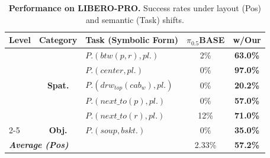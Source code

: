 \begin{table}[t]
  \centering
\caption{\textbf{Performance on LIBERO-PRO.} Success rates under layout (Pos) and semantic (Task) shifts.}%
  \label{tab:libero_pro}
  \small %
  \addtolength{\tabcolsep}{-4pt} %
  
  {
  \setlength{\aboverulesep}{0pt}
  \setlength{\belowrulesep}{0pt}
  
  \begin{tabular}{l|clcc}
    \toprule
    \rule{0pt}{3ex} \textbf{Level} & \textbf{Category} & \textbf{Task (Symbolic Form)} & \textbf{$\pi_{0.5}$BASE} & \textbf{w/Our} \\
    \midrule
    
    \rule{0pt}{2.5ex} \multirow{6}{*}{\textbf{Pos}} & \multirow{5}{*}{\textbf{Spat.}} 
      & $P.(btw(p, r), pl.)$        & 2\% & \textbf{63.0\%} \\
    & & $P.(center, pl.)$            & 0\% & \textbf{97.0\%} \\
    & & $P.(drw_{top}(cab_{w}), pl.)$ & 0\% & \textbf{20.2\%} \\
    & & $P.(next\_to(p), pl.)$       & 0\% & \textbf{57.0\%} \\
    & & $P.(next\_to(r), pl.)$       & 12\% & \textbf{71.0\%} \\
    \cmidrule(l){2-5}
    & \rule{0pt}{2.5ex} \textbf{Obj.} & $P.(soup, bskt.)$ & 0\% & \textbf{35.0\%} \\
    \midrule
    \multicolumn{3}{l|}{\rule{0pt}{2.5ex} \textit{\textbf{Average (Pos)}}} & 2.33\% & \textbf{57.2\%} \\
    
    \midrule 
    

\end{tabular}}
\end{table}
